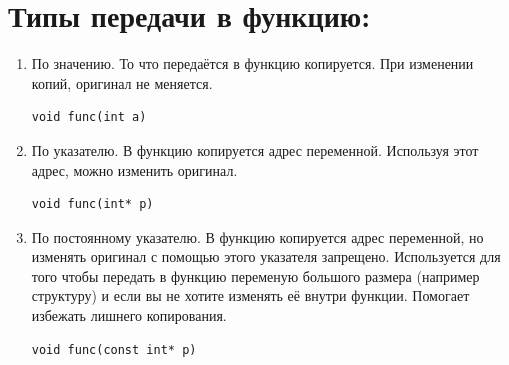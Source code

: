 \documentclass{article}
\begin{document}
\section*{Типы передачи в функцию:}
\begin{enumerate}
\item По значению. То что передаётся в функцию копируется. При изменении копий, оригинал не меняется.
\begin{lstlisting}
void func(int a)
\end{lstlisting}
\item По указателю. В функцию копируется адрес переменной. Используя этот адрес, можно изменить оригинал.
\begin{lstlisting}
void func(int* p)
\end{lstlisting}
\item По постоянному указателю. В функцию копируется адрес переменной, но изменять оригинал с помощью этого указателя запрещено. Используется для того чтобы передать в функцию переменую большого размера (например структуру) и если вы не хотите изменять её внутри функции. Помогает избежать лишнего копирования.
\begin{lstlisting}
void func(const int* p)
\end{lstlisting}
\end{enumerate}
\fi
\end{document}
